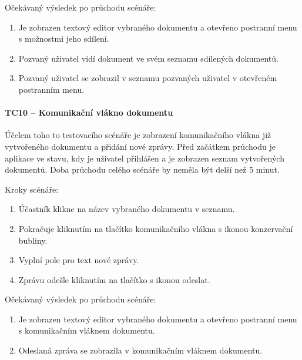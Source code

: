 Očekávaný výsledek po průchodu scénáře:
\begin{enumerate}
    \item Je zobrazen textový editor vybraného dokumentu a otevřeno postranní menu s možnostmi jeho sdílení.
    \item Pozvaný uživatel vidí dokument ve svém seznamu sdílených dokumentů.
    \item Pozvaný uživatel se zobrazil v seznamu pozvaných uživatel v otevřeném postranním menu.
\end{enumerate}

\paragraph{TC10 -- Komunikační vlákno dokumentu}

Účelem toho to testovacího scénáře je zobrazení komunikačního vlákna již vytvořeného dokumentu a přidání nové zprávy.
Před začátkem průchodu je aplikace ve stavu, kdy je uživatel přihlášen a je zobrazen seznam vytvořených dokumentů.
Doba průchodu celého scénáře by neměla být delší než 5 minut.

Kroky scénáře:
\begin{enumerate}
    \item Účastník klikne na název vybraného dokumentu v seznamu.
    \item Pokračuje kliknutím na tlačítko komunikačního vlákna s ikonou konzervační bubliny.
    \item Vyplní pole pro text nové zprávy.
    \item Zprávu odešle kliknutím na tlačítko s ikonou odeslat.
\end{enumerate}

Očekávaný výsledek po průchodu scénáře:
\begin{enumerate}
    \item Je zobrazen textový editor vybraného dokumentu a otevřeno postranní menu s komunikačním vláknem dokumentu.
    \item Odeslaná zpráva se zobrazila v komunikačním vláknem dokumentu.
\end{enumerate}
